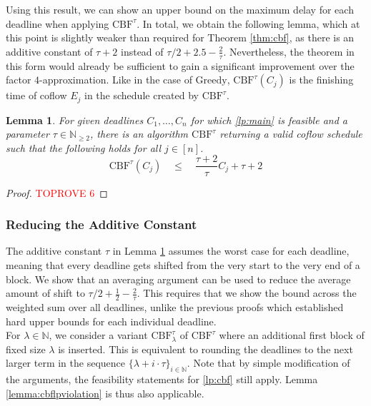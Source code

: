 \documentclass[11pt]{article}
\newtheorem{lemma}[theorem]{Lemma}
\begin{document}
\noindent Using this result, we can show an upper bound on the maximum delay for each deadline when applying $\mathrm{CBF}^\tau$. In total, we obtain the following lemma, which at this point is slightly weaker than required for Theorem \ref{thm:cbf}, as there is an additive constant of $\tau+2$ instead of $\tau/2 + 2.5 - \frac{2}{\tau}$. Nevertheless, the theorem in this form would already be sufficient to gain a significant improvement over the factor $4$-approximation. Like in the case of $\mathrm{Greedy}$, $\mathrm{CBF}^\tau(C_j)$ is the finishing time of coflow $E_j$ in the schedule created by $\mathrm{CBF}^\tau$. 
\begin{lemma}\label{lemma:cbfweak}
For given deadlines $C_1,\dotsc,C_n$ for which \ref{lp:main} is feasible and a parameter $\tau \in \mathbb{N}_{\ge 2}$, there is an algorithm $\mathrm{CBF}^\tau$ returning a valid coflow schedule such that the following holds for all $j \in [n]$.
\begin{equation*}
    \mathrm{CBF}^\tau(C_j) \quad \le \quad \frac{\tau+2}{\tau}C_j + \tau + 2
\end{equation*}
\end{lemma}
\begin{proof}\textcolor{red}{TOPROVE 6}\end{proof}

\subsubsection*{Reducing the Additive Constant}
The additive constant $\tau$ in Lemma \ref{lemma:cbfweak} assumes the worst case for each deadline, meaning that every deadline gets shifted from the very start to the very end of a block. We show that an averaging argument can be used to reduce the average amount of shift to $\tau/2 + \frac{1}{2} - \frac{2}{\tau}$. This requires that we show the bound across the weighted sum over all deadlines, unlike the previous proofs which established hard upper bounds for each individual deadline.\\

For $\lambda \in \mathbb{N}$, we consider a variant $\mathrm{CBF}^\tau_\lambda$ of $\mathrm{CBF}^\tau$ where an additional first block of fixed size $\lambda$ is inserted. This is equivalent to rounding the deadlines to the next larger term in the sequence $\{\lambda+i\cdot\tau\}_{i \in \mathbb{N}}$. Note that by simple modification of the arguments, the feasibility statements for \ref{lp:cbf} still apply. Lemma \ref{lemma:cbflpviolation} is thus also applicable.\\
\end{document}
